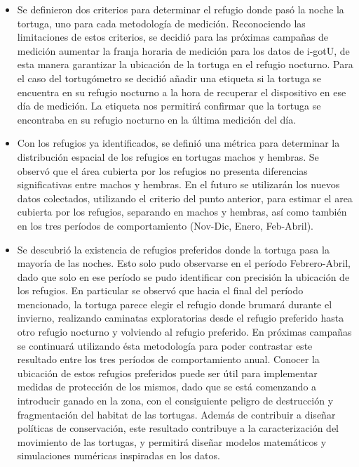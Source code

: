 \begin{itemize}
 
\item Se definieron dos criterios para determinar el refugio donde pasó la noche la tortuga, uno para cada metodología de medición. Reconociendo las limitaciones de estos criterios, se decidió para las próximas campañas de medición aumentar la franja horaria de medición para los datos de i-gotU, de esta manera garantizar la ubicación de la tortuga en el refugio nocturno. Para el caso del tortugómetro se decidió añadir una etiqueta si la tortuga se encuentra en su refugio nocturno a la hora de recuperar el dispositivo en ese día de medición. La etiqueta nos permitirá confirmar que la tortuga se encontraba en su refugio nocturno en la última medición del día.  
 
\item Con los refugios ya identificados, se definió una métrica para determinar la distribución espacial de los refugios en tortugas machos y hembras. Se observó que el área cubierta por los refugios no presenta diferencias significativas entre machos y hembras. En el futuro se utilizarán los nuevos datos colectados, utilizando el criterio del punto anterior, para estimar el area cubierta por los refugios, separando en machos y hembras, así como también en los tres períodos de comportamiento (Nov-Dic, Enero, Feb-Abril). 
 
\item Se descubrió la existencia de refugios preferidos donde la tortuga pasa la mayoría de las noches. Esto solo pudo observarse en el período Febrero-Abril, dado que solo en ese período se pudo identificar con precisión la ubicación de los refugios. En particular se observó que hacia el final del período mencionado, la tortuga parece elegir el refugio donde brumará durante el invierno, realizando caminatas exploratorias desde el refugio preferido hasta otro refugio nocturno y volviendo al refugio preferido. En próximas campañas se continuará utilizando ésta metodología para poder contrastar este resultado entre los tres períodos de comportamiento anual. Conocer la ubicación de estos refugios preferidos puede ser útil para implementar medidas de protección de los mismos, dado que se está comenzando a introducir ganado en la zona, con el consiguiente peligro de destrucción y fragmentación del habitat de las tortugas. Además de contribuir a diseñar políticas de conservación, este resultado contribuye a la caracterización del movimiento de las tortugas, y permitirá diseñar modelos matemáticos y simulaciones numéricas inspiradas en los datos.
 

\end{itemize}

